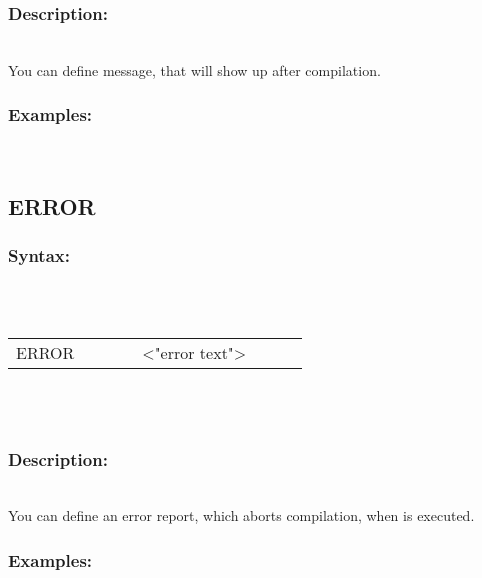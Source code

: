         \subsubsection{Description:}\\
        You can define message, that will show up after compilation.  \\
        \subsubsection{Examples:}\\
                \begin{code}[h!]
                    directive}\verb'MESSAGE'}\verb'    '
                    constant}\verb'"Text, that will show up in the codelisting"'}
                \end{code}

        \subsection{ERROR}
        \subsubsection{Syntax:}\\
        \\ {
            \texttt{}
            \begin{tabular}[h!]{llll}
                { \color{highlight_directive} ERROR }\verb`       `{ \color{highlight_string} <"error text"> }
            \end{tabular}
            }\\
            \\
        \subsubsection{Description:}\\
        You can define an error report, which aborts compilation, when is executed.  \\
        \subsubsection{Examples:}\\
                \begin{code}[h!]
                    directive}\verb'ERROR'}\verb'    '
                    constant}\verb'"Text, that will show up in the codelisting"'}
                \end{code}

